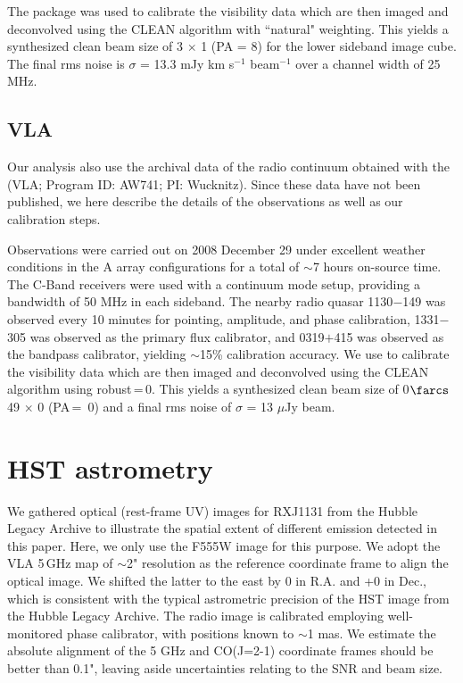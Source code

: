 \documentclass[]{emulateapj}
\begin{document}
The  package was used to calibrate the visibility data which are
then imaged and deconvolved using the CLEAN algorithm with ``natural" weighting. This yields a synthesized clean
beam size of 3 $\times$ 1 (PA = 8\degr) for the lower sideband
image cube. The final rms noise is $\sigma$ = 13.3 mJy km s$^{-1}$ beam$^{-1}$
over a channel width of 25 MHz.

\subsection{VLA} %
Our analysis also use the archival data of the radio continuum obtained with the \vla (VLA; Program ID: AW741; PI: Wucknitz). Since these data have not been
published, we here describe the details of the observations as well as our calibration steps.

Observations were carried out on 2008 December 29 under excellent weather
conditions in the A array configurations for a total of $\sim$7 hours on-source time. The C-Band receivers were used with a continuum mode setup, providing a bandwidth of 50
MHz in each sideband.
The nearby radio quasar 1130$-$149 was observed every 10 minutes for
pointing, amplitude, and phase calibration, 1331$-$305 was observed as the
primary flux calibrator, and 0319$+$415 was observed as the bandpass calibrator, yielding $\sim$15\% calibration accuracy.
We use \aips to calibrate the visibility data which
are then imaged and deconvolved using
the CLEAN algorithm using robust\,=\,0. This yields a synthesized clean
beam size of 0$\farcs$49 $\times$ 0 (PA\,=\, 0) and a final
rms noise of $\sigma$ = 13 $\mu$Jy beam\pmOne.


\section{HST astrometry}
We gathered optical (rest-frame UV) images for RXJ1131 from the Hubble Legacy Archive to illustrate the
spatial extent of different emission detected in this paper. Here, we only use the F555W image for
this purpose.
We adopt the VLA 5\,GHz map of $\sim$2" resolution as the reference coordinate frame to align the optical image.
We shifted the latter to the east by 0 in R.A. and +0 in Dec., which is consistent with the typical astrometric precision of the HST image from the Hubble
Legacy Archive. %
The radio image is calibrated employing well-monitored phase calibrator, with positions known to $\sim$1 mas.
We estimate the absolute alignment of the 5 GHz and CO(J=2-1) coordinate frames should
be better than 0.1", leaving aside uncertainties relating to the SNR and beam size.
\end{document}
